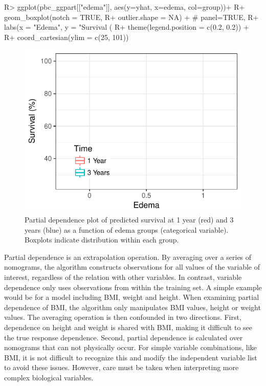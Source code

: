 \documentclass[article]{jss}
\begin{document}
\begin{Schunk}
\begin{Sinput}
R> ggplot(pbc_ggpart[["edema"]], aes(y=yhat, x=edema, col=group))+
R+   geom_boxplot(notch = TRUE,
R+                outlier.shape = NA) + # panel=TRUE,
R+   labs(x = "Edema", y = "Survival (%
R+   theme(legend.position = c(0.2, 0.2)) +
R+   coord_cartesian(ylim = c(25, 101))
\end{Sinput}
\begin{figure}[!htb]

{\centering \includegraphics{fig-rfs/rfs-pbc-partial-edema-1} 

}

\caption[Partial dependence plot of predicted survival at 1 year (red) and 3 years (blue) as a function of edema groups (categorical variable)]{Partial dependence plot of predicted survival at 1 year (red) and 3 years (blue) as a function of edema groups (categorical variable). Boxplots indicate distribution within each group.}\label{fig:pbc-partial-edema}
\end{figure}
\end{Schunk}

Partial dependence is an extrapolation operation. By averaging over a series of nomograms, the algorithm constructs observations for all values of the variable of interest, regardless of the relation with other variables. In contrast, variable dependence only uses observations from within the training set. A simple example would be for a model including BMI, weight and height. When examining partial dependence of BMI, the algorithm only manipulates BMI values, height or weight values. The averaging operation is then confounded in two directions. First, dependence on height and weight is shared with BMI, making it difficult to see the true response dependence. Second, partial dependence is calculated over nomograms that can not physically occur. For simple variable combinations, like BMI, it is not difficult to recognize this and modify the independent variable list to avoid these issues. However, care must be taken when interpreting more complex biological variables.
\end{document}
